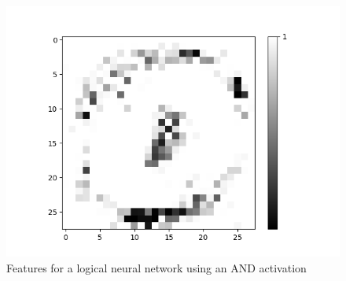 \documentclass{beamer}
\begin{document}
\begin{frame}
\begin{minipage}[t]{0.4\textwidth}
\begin{figure}[H]
	\medskip

	\begin{minipage}[b]{0.7\textwidth}
		\captionsetup{labelformat=empty}
		\includegraphics[width=\textwidth]{Images/AND(LSM)/Negative/Layer0-Neuron-0.png}
	\end{minipage}
	\caption{Features for a logical neural network using an AND activation}
	\hfill
\end{figure}
\end{minipage}

\end{frame}
\end{document}
